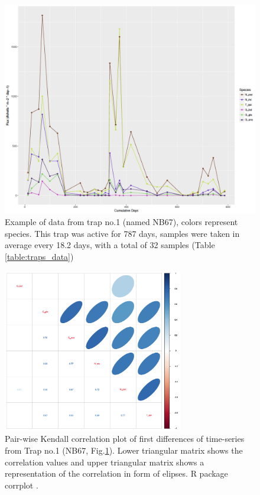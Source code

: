 \begin{figure}
\centering
\includegraphics[width=1\textwidth]{NB67_series.png}
\caption{\label{fig:NB67_series} Example of data from trap no.1 (named NB67), colors represent species. This trap was active for 787 days, samples were taken in average every 18.2 days, with a total of 32 samples (Table \ref{table:traps_data})}
\end{figure}


\begin{figure}
\centering
\includegraphics[width=0.7\textwidth]{NB67_corrplot_kendall_fd.png}
\caption{\label{fig:NB67_corrplot} Pair-wise Kendall correlation plot of first differences of time-series from Trap no.1 (NB67, Fig.\ref{fig:NB67_series}). Lower triangular matrix shows the correlation values and upper triangular matrix shows a representation of the correlation in form of elipses. R package corrplot \cite{wei2016corrplot}.}
\end{figure}



